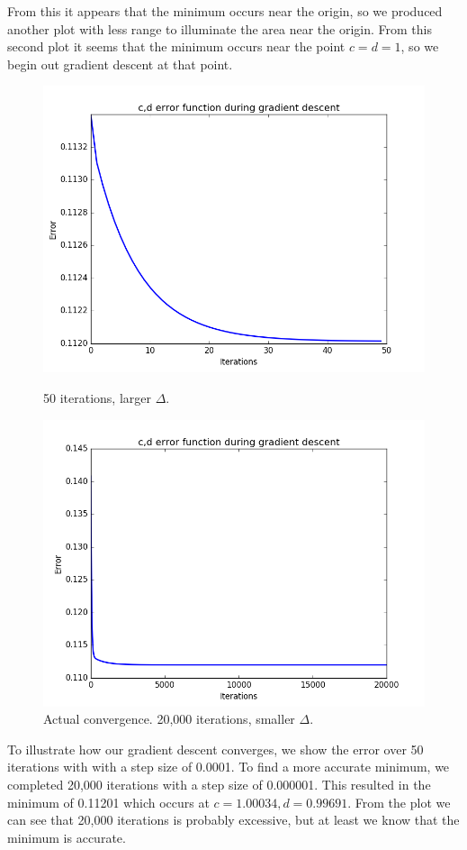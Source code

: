 \documentclass{article}
\begin{document}
From this it appears that the minimum occurs near the origin, so we produced another plot with less range to illuminate the area near the origin.
From this second plot it seems that the minimum occurs near the point $c=d=1$, so we begin out gradient descent at that point.
\\
\begin{figure}[H]
  \centering
  \begin{minipage}[t]{0.49\textwidth}
    \includegraphics[width=\textwidth]{exercise6/cd_descent_illustration.png}
    \caption*{50 iterations, larger $\Delta$.}
  \end{minipage}
  \begin{minipage}[t]{0.49\textwidth}
    \includegraphics[width=\textwidth]{exercise6/cd_descent_actual.png}
    \caption*{Actual convergence. 20,000 iterations, smaller $\Delta$.}
  \end{minipage}
\end{figure}
To illustrate how our gradient descent converges, we show the error over 50 iterations with with a step size of 0.0001.
To find a more accurate minimum, we completed 20,000 iterations with a step size of 0.000001.
This resulted in the minimum of 0.11201 which occurs at $c=1.00034, d=0.99691$.
From the plot we can see that 20,000 iterations is probably excessive, but at least we know that the minimum is accurate.\\
\end{document}

